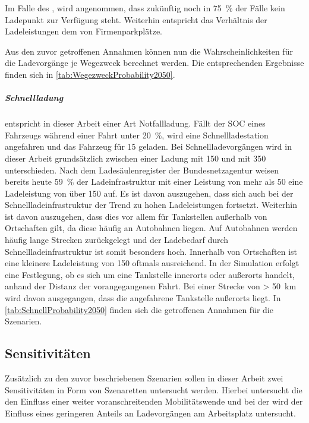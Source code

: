 Im Falle des \UCs \Straszenranddot, wird angenommen, dass zukünftig noch in \SI{75}{\percent} der Fälle kein Ladepunkt zur Verfügung steht.
Weiterhin entspricht das Verhältnis der Ladeleistungen dem von Firmenparkplätze.\medskip

Aus den zuvor getroffenen Annahmen können nun die Wahrscheinlichkeiten für die Ladevorgänge je Wegezweck berechnet werden.
Die entsprechenden Ergebnisse finden sich in \autoref{tab:WegezweckProbability2050}.




\subparagraph{Schnellladung} entspricht in dieser Arbeit einer Art Notfallladung.
Fällt der \gls{SOC} eines Fahrzeugs während einer Fahrt unter \SI{20}{\percent}, wird eine Schnellladestation angefahren und das Fahrzeug für \SI{15}{\Minuten} geladen.
Bei Schnellladevorgängen wird in dieser Arbeit grundsätzlich zwischen einer Ladung mit \SI{150}{\kw} und mit \SI{350}{\kw} unterschieden.
Nach dem Ladesäulenregister der Bundesnetzagentur \cite[][Stand: ]{BundesnetzagenturElektrizitaet2020} weisen bereits heute \SI{59}{\percent} der Ladeinfrastruktur mit einer Leistung von mehr als \SI{50}{\kw} eine Ladeleistung von über \SI{150}{\kw} auf.
Es ist davon auszugehen, dass sich auch bei der Schnellladeinfrastruktur der Trend zu hohen Ladeleistungen fortsetzt.
Weiterhin ist davon auszugehen, dass dies vor allem für Tankstellen außerhalb von Ortschaften gilt, da diese häufig an Autobahnen liegen.
Auf Autobahnen werden häufig lange Strecken zurückgelegt und der Ladebedarf durch Schnellladeinfrastruktur ist somit besonders hoch.
Innerhalb von Ortschaften ist eine kleinere Ladeleistung von \SI{150}{\kw} oftmals ausreichend.
In der Simulation erfolgt eine Festlegung, ob es sich um eine Tankstelle innerorts oder außerorts handelt, anhand der Distanz der vorangegangenen Fahrt.
Bei einer Strecke von \SI{> 50}{\km} wird davon ausgegangen, dass die angefahrene Tankstelle außerorts liegt.
In \autoref{tab:SchnellProbability2050} finden sich die getroffenen Annahmen für die Szenarien.




\subsection{Sensitivitäten}

Zusätzlich zu den zuvor beschriebenen Szenarien sollen in dieser Arbeit zwei Sensitivitäten in Form von Szenaretten untersucht werden.
Hierbei untersucht die \Kleinwagen den Einfluss einer weiter voranschreitenden Mobilitätswende und bei der \SzeFirmenparkplatz wird der Einfluss eines geringeren Anteils an Ladevorgängen am Arbeitsplatz untersucht.


